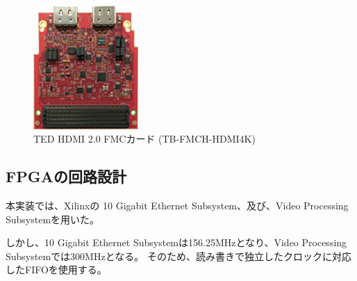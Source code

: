 \begin{figure}[htbp]
    \begin{center}
        \includegraphics[bb=0 0 137 161,width=4cm]{img/ted-4k-fmc-card.jpg}
    \end{center}
    \caption{TED HDMI 2.0 FMCカード (TB-FMCH-HDMI4K)}
    \label{fig:ted-4k-fmc-card}
\end{figure}

\subsection{FPGAの回路設計}

本実装では、Xilinxの 10 Gigabit Ethernet Subsystem、及び、Video Processing Subsystemを用いた。




しかし、10 Gigabit Ethernet Subsystemは156.25MHzとなり、Video Processing Subsystemでは300MHzとなる。
そのため、読み書きで独立したクロックに対応したFIFOを使用する。



